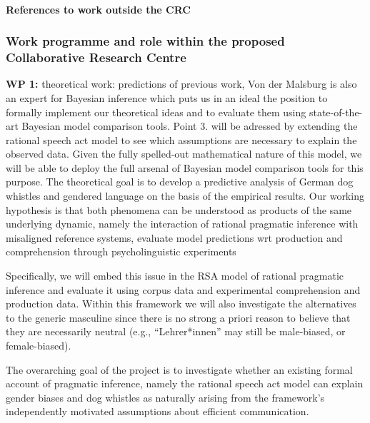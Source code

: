 \documentclass[11pt]{article}
\begin{document}
\paragraph{References to work outside the CRC}
\printbibliography[heading=none,keyword={TMJT-external}]

\subsubsection{Work programme and role within the proposed Collaborative Research Centre}

{\bf WP 1:} theoretical work: predictions of previous work, Von der Malsburg is also an expert for Bayesian inference \parencite{MorganEtAl2020, MeziereEtAl2021} which puts us in an ideal the position to formally implement our theoretical ideas and to evaluate them using state-of-the-art Bayesian model comparison tools.
\citealt{stevens-etal2017} Point 3. will be adressed by extending the rational speech act model to see which assumptions are necessary to explain the observed data.  Given the fully spelled-out mathematical nature of this model, we will be able to deploy the full arsenal of Bayesian model comparison tools for this purpose. The theoretical goal is to develop a predictive analysis of German dog whistles and gendered language on the basis of the empirical results. Our working hypothesis is that both phenomena can be understood as products of the same underlying dynamic, namely the interaction of rational pragmatic inference with misaligned reference systems, evaluate model predictions wrt production and comprehension through psycholinguistic experiments

Specifically, we will embed this issue in the RSA model of rational pragmatic inference and evaluate it using corpus data and experimental comprehension and production data.  Within this framework we will also investigate the alternatives to the generic masculine since there is no strong a priori reason to believe that they are necessarily neutral (e.g., “Lehrer*innen” may still be male-biased, or female-biased).


The overarching goal of the project is to investigate whether an existing formal account of pragmatic inference, namely the rational speech act model \parencite[RSA, ][]{FrankGoodman2012} can explain gender biases and dog whistles as naturally arising from the framework's independently motivated assumptions about efficient communication.  
\end{document}
